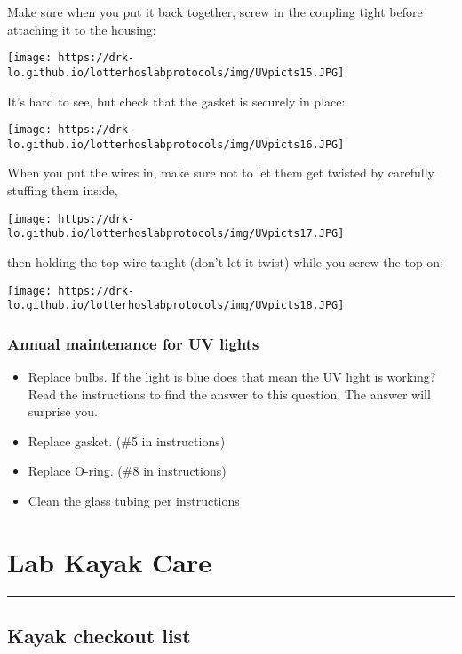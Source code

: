 \documentclass[
  letterpaper,
  DIV=11,
  numbers=noendperiod]{scrreprt}
\begin{document}
Make sure when you put it back together, screw in the coupling tight
before attaching it to the housing:

\texttt{[image: https://drk-lo.github.io/lotterhoslabprotocols/img/UVpicts15.JPG]}

It's hard to see, but check that the gasket is securely in place:

\texttt{[image: https://drk-lo.github.io/lotterhoslabprotocols/img/UVpicts16.JPG]}

When you put the wires in, make sure not to let them get twisted by
carefully stuffing them inside,

\texttt{[image: https://drk-lo.github.io/lotterhoslabprotocols/img/UVpicts17.JPG]}

then holding the top wire taught (don't let it twist) while you screw
the top on:

\texttt{[image: https://drk-lo.github.io/lotterhoslabprotocols/img/UVpicts18.JPG]}

\hypertarget{annual-maintenance-for-uv-lights}{%
\subsection*{\texorpdfstring{\textbf{Annual maintenance for UV
lights}}{Annual maintenance for UV lights}}\label{annual-maintenance-for-uv-lights}}

\begin{itemize}
\item
  Replace bulbs. If the light is blue does that mean the UV light is
  working? Read the instructions to find the answer to this question.
  The answer will surprise you.
\item
  Replace gasket. (\#5 in instructions)
\item
  Replace O-ring. (\#8 in instructions)
\item
  Clean the glass tubing per instructions
\end{itemize}

\hypertarget{lab-kayak-care}{%
\chapter{Lab Kayak Care}\label{lab-kayak-care}}

\begin{center}\rule{0.5\linewidth}{0.5pt}\end{center}

\hypertarget{kayak-checkout-list}{%
\section*{\texorpdfstring{\textbf{Kayak checkout
list}}{Kayak checkout list}}\label{kayak-checkout-list}}
\end{document}
